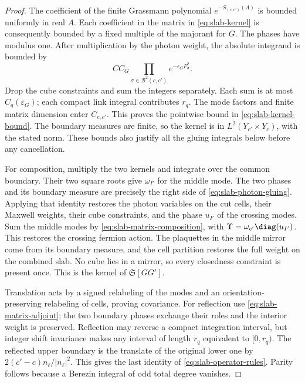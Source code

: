 \begin{proof}
The coefficient of the finite Grassmann polynomial
$e^{-S_{(c,c')}(A)}$ is bounded uniformly in real $A$. Each coefficient
in the matrix in \eqref{eq:slab-kernel} is consequently bounded by a
fixed multiple of the majorant for $G$. The phases have modulus one.
After multiplication by the photon weight, the absolute integrand is
bounded by
\[
 C C_G\prod_{\sigma\in\mathcal B^2(c,c')}
                           e^{-\varepsilon_GF_\sigma^2}.
\]
Drop the cube constraints and sum the integers separately. Each sum
is at most $C_q(\varepsilon_G)$; each compact link integral contributes
$r_q$. The mode factors and finite matrix dimension enter $C_{c,c'}$.
This proves the pointwise bound in \eqref{eq:slab-kernel-bound}.
The boundary measures are finite, so the kernel is in
$L^2(Y_{c'}\times Y_c)$, with the stated norm. These bounds also
justify all the gluing integrals below before any cancellation.

For composition, multiply the two kernels and integrate over the common
boundary. Their two square roots give $\omega_{I'}$ for the middle
mode. The two phases and its boundary measure are precisely the right
side of \eqref{eq:slab-photon-gluing}. Applying that identity restores
the photon variables on the cut cells, their Maxwell weights, their
cube constraints, and the phase $u_{I'}$ of the crossing modes. Sum
the middle modes by \eqref{eq:slab-matrix-composition}, with
$\Upsilon=\omega_{c'}\diag(u_{I'})$. This restores the crossing
fermion action. The plaquettes in the middle mirror come from its
boundary measure, and the cell partition restores the full weight on
the combined slab. No cube lies in a mirror, so every closedness
constraint is present once. This is the kernel of $\mathfrak S[GG']$.

Translation acts by a signed relabeling of the modes and an
orientation-preserving relabeling of cells, proving covariance.
For reflection use \eqref{eq:slab-matrix-adjoint}; the two boundary
phases exchange their roles and the interior weight is preserved.
Reflection may reverse a compact integration interval, but integer
shift invariance makes any interval of length $r_q$ equivalent to
$[0,r_q)$. The reflected upper boundary is the translate of the
original lower one by $2(c'-c)n_\ell/|n_\ell|^2$. This gives the last
identity of \eqref{eq:slab-operator-rules}. Parity follows because a
Berezin integral of odd total degree vanishes.


\end{proof}
